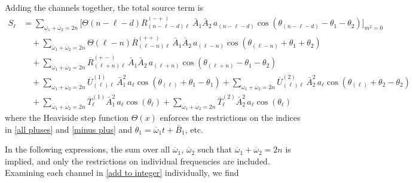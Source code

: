 \documentclass[letterpaper,11pt]{article}
\newcommand{\oone}{\overline{\omega}_1}
\newcommand{\otwo}{\overline{\omega}_2}
\begin{document}
Adding the channels together, the total source term is
\begin{align}
\label{add to integer}
S_\ell &=  \!\!\!\! \sum_{\oone + \otwo = 2n}\bigg[ \Theta\left( n - \ell - d \right) \overline{R}^{(-+)}_{(n - \ell - d) \ell} \ \bar A_1 \bar A_2 \, a_{(n - \ell - d)} \cos \left( \theta_{(n - \ell - d)} - \theta_1 - \theta_2 \right) \bigg]_{m^2 = 0}  \nonumber \\ 
%
&  \quad + \!\!\!\! \sum_{\oone + \otwo = 2n} \!\!\!\! \Theta \left( \ell - n \right)  \overline{R}^{(++)}_{(\ell - n)\ell} \, \bar A_1 \bar A_2 \, a_{(\ell - n)} \cos \left( \theta_{(\ell - n)} + \theta_1 + \theta_2 \right) \nonumber \\
%
& \quad  + \!\!\!\! \sum_{\oone + \otwo = 2n} \!\!\!\! \overline{R}^{(+-)}_{(\ell + n) \ell} \, \bar A_1 \bar A_2 \, a_{(\ell + n)} \cos\left( \theta_{(\ell + n)} - \theta_1 - \theta_2 \right) \nonumber \\
%
& \quad + \!\!\!\! \sum_{\oone + \otwo = 2n} \!\!\!\! \overline{U}^{(1)}_{(\ell)\ell} \, \bar A_1^2 \, a_\ell \cos\left( \theta_{(\ell)} + \theta_1 - \theta_1 \right) + \!\!\!\! \sum_{\oone + \otwo = 2n} \!\!\!\! \overline{U}^{(2)}_{(\ell)\ell} \, \bar A_2^2 \, a_\ell \cos\left( \theta_{(\ell)} + \theta_2 - \theta_2 \right) \nonumber \\
%
& \quad + \!\!\!\! \sum_{\oone + \otwo = 2n} \!\!\!\! \overline{T}^{(1)}_{\ell} \bar A_1^2 \, a_\ell \cos \left( \theta_\ell \right) + \!\!\!\! \sum_{\oone + \otwo = 2n} \!\!\!\! \overline{T}^{(2)}_{\ell} \bar A_2^2 \, a_\ell \cos \left( \theta_\ell \right)
\end{align}
where the Heaviside step function $\Theta(x)$ enforces the restrictions on the indices in \eqref{all pluses} and \eqref{minus plus} and $\theta_1 = \oone t + \bar B_1$, etc. 

In the following expressions, the sum over all $\oone$, $\otwo$ such that $\oone + \otwo = 2n$ is implied, and only the restrictions on individual frequencies are included. Examining each channel in \eqref{add to integer} individually, we find
\end{document}
